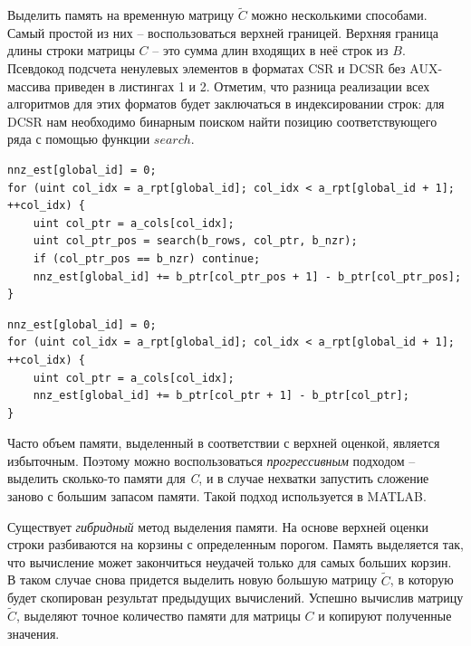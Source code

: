 \documentclass[14pt]{extarticle}
\begin{document}
	Выделить память на временную матрицу $\tilde{C}$ можно несколькими способами. Самый простой из них -- воспользоваться верхней границей. Верхняя граница длины строки матрицы $C$ -- это сумма длин входящих в неё строк из $B$.  Псевдокод подсчета ненулевых элементов в форматах CSR и DCSR без AUX-массива приведен в листингах 1 и 2. Отметим, что разница реализации всех алгоритмов для этих форматов будет заключаться в индексировании строк: для DCSR нам необходимо бинарным поиском найти позицию соответствующего ряда с помощью функции $search$.
			
\begin{minipage}{\linewidth}%
\small
\begin{lstlisting}[breaklines=true, basicstyle=\small, caption={Оценка размера ряда, формат DCSR}, style=mystyle]
nnz_est[global_id] = 0;
for (uint col_idx = a_rpt[global_id]; col_idx < a_rpt[global_id + 1]; ++col_idx) {
	uint col_ptr = a_cols[col_idx];
	uint col_ptr_pos = search(b_rows, col_ptr, b_nzr);
	if (col_ptr_pos == b_nzr) continue;
	nnz_est[global_id] += b_ptr[col_ptr_pos + 1] - b_ptr[col_ptr_pos];
}
\end{lstlisting}
\end{minipage}

\begin{minipage}{\linewidth}%
\small
\begin{lstlisting}[breaklines=true, basicstyle=\small, caption={Оценка размера ряда, формат CSR}, style=mystyle]
nnz_est[global_id] = 0;
for (uint col_idx = a_rpt[global_id]; col_idx < a_rpt[global_id + 1]; ++col_idx) {
	uint col_ptr = a_cols[col_idx];
	nnz_est[global_id] += b_ptr[col_ptr + 1] - b_ptr[col_ptr];
}
\end{lstlisting}
\end{minipage}

	Часто объем памяти, выделенный в соответствии с верхней оценкой, является избыточным. Поэтому можно воспользоваться \emph{прогрессивным} подходом – выделить сколько-то памяти для \textit{C}, и в случае нехватки запустить сложение заново с большим запасом памяти. Такой подход используется в MATLAB\cite{matlab}. 

	Существует \emph{гибридный} метод выделения памяти. На основе верхней оценки строки разбиваются на корзины с определенным порогом. Память выделяется так, что вычисление может закончиться неудачей только для самых больших корзин. В таком случае снова придется выделить новую б\emph{о}льшую матрицу $\tilde{C}$, в которую будет скопирован результат предыдущих вычислений. 
	Успешно вычислив матрицу $\tilde{C}$, выделяют точное количество памяти для матрицы $C$ и копируют полученные значения.
	
\end{document}
